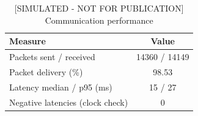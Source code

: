 \begin{table}[t]\centering\footnotesize
\caption{[SIMULATED - NOT FOR PUBLICATION] Communication performance}
\label{tab:fieldnet}
\begin{tabular}{lc}\toprule
Measure & Value\\\midrule
Packets sent / received & 14360 / 14149\\
Packet delivery (\%) & 98.53\\
Latency median / p95 (ms) & 15 / 27\\
Negative latencies (clock check) & 0\\
\bottomrule\end{tabular}\end{table}
